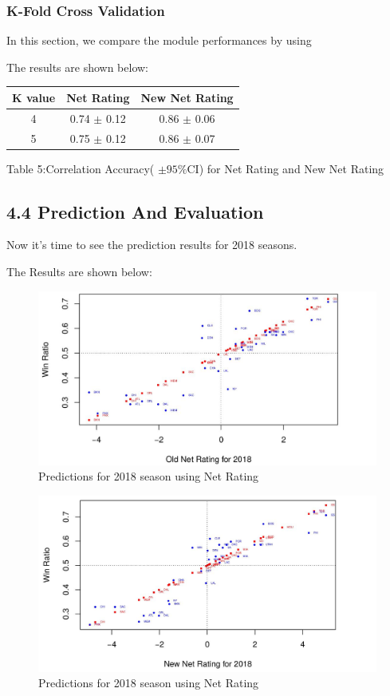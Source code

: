 \documentclass[11pt]{article}
\begin{document}
\subsubsection*{K-Fold Cross Validation}
In this section, we compare the module performances by using 

The results are shown below:

\begin{center}
\begin{tabular}{|c|c|c|}
\hline
 K value & Net Rating & New Net Rating \\
\hline
 4 & 0.74 $\pm$ 0.12 & 0.86 $\pm$ 0.06\\
 5 & 0.75 $\pm$ 0.12 & 0.86 $\pm$ 0.07 \\
\hline
\end{tabular}
\bigskip

Table 5:Correlation Accuracy( $\pm 95\%$CI) for Net Rating and New Net Rating
\end{center}

\subsection*{4.4 Prediction And Evaluation}

Now it's time to see the prediction results for 2018 seasons.

The Results are shown below:

\begin{figure}[h!]
  \centering
    \includegraphics[width=\linewidth]{old_nr_pre.jpg}
  \caption{Predictions for 2018 season using Net Rating}
\end{figure}

\begin{figure}[h!]
  \centering
    \includegraphics[width=\linewidth]{new_nr_pre.jpg}
  \caption{Predictions for 2018 season using Net Rating}
\end{figure}
\end{document}
